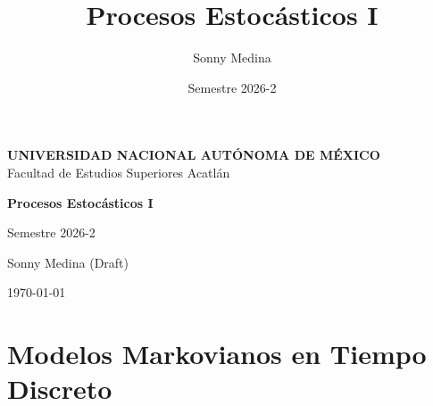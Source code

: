 \documentclass[12pt]{book}
\title{Procesos Estocásticos I}
\author{Sonny Medina}
\date{Semestre 2026-2}
\begin{document}
\begin{titlepage}
    \centering
    \vspace*{1cm}
    
    {\Large \textbf{UNIVERSIDAD NACIONAL AUTÓNOMA DE MÉXICO}}\\
    \vspace{0.3cm}
    {\large Facultad de Estudios Superiores Acatlán}\\
    
    \vspace{3cm}
    
    {\Huge \textbf{Procesos Estocásticos I}}\\
    
    \vspace{2cm}
    
    {\Large Semestre 2026-2}\\
    
    \vspace{3cm}
    
    {\large Sonny Medina (Draft)}\\
    
    \vfill
    
    {\large \today}
    
\end{titlepage}

\tableofcontents
\newpage

\chapter{Modelos Markovianos en Tiempo Discreto}
\end{document}
